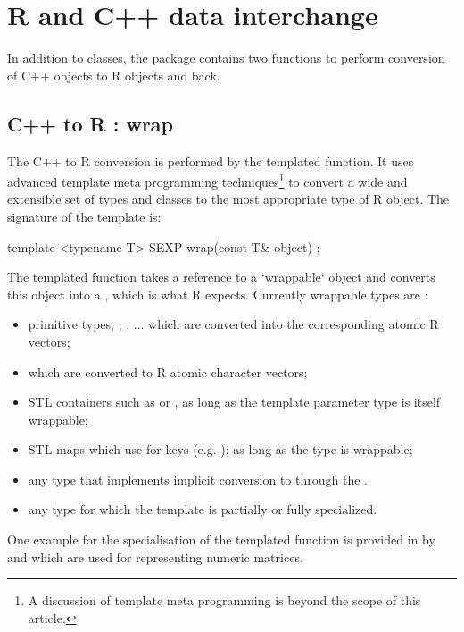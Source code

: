 \section{R and C++ data interchange}

In addition to classes, the  package contains two 
functions to perform conversion of C++ objects to R objects and back. 

\subsection{C++ to R : wrap}

The C++ to R conversion is performed by the  templated
function. It uses advanced template meta programming techniques\footnote{A
  discussion of template meta programming is beyond the scope of this
  article.}  to convert a wide and extensible set of types and classes to the
most appropriate type of R object. The signature of the  template
is:

\begin{example}
template <typename T> 
SEXP wrap(const T& object) ;
\end{example}

The templated function takes a reference to a `wrappable` 
object and converts this object into a , which is what R expects. 
Currently wrappable types are :
\begin{itemize}
\item primitive types, , , ... which are converted 
into the corresponding atomic R vectors;
\item {} which are converted to R atomic character vectors;
\item STL containers such as  or , 
as long as the template parameter type  is itself wrappable;
\item STL maps which use  for keys 
(e.g. ); as long as 
the type  is wrappable;
\item any type that implements implicit conversion to  through the 
.
\item any type for which the  template is partially or fully 
specialized.
\end{itemize}
One example for the specialisation of the templated  function is
provided in  \citep{cran:rinside} by  and  which are used for
representing numeric matrices.

